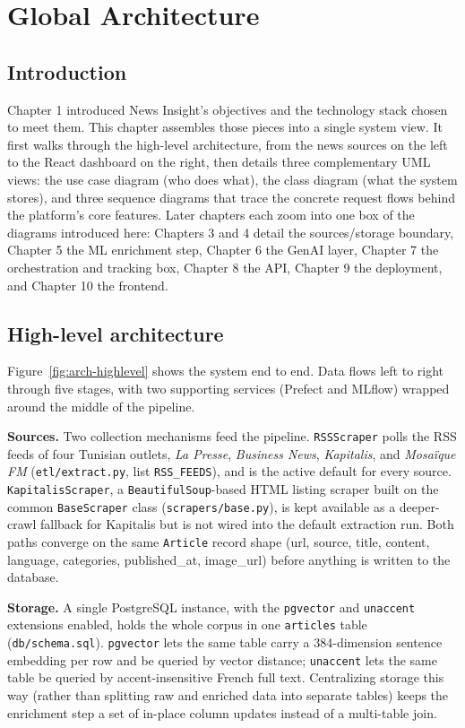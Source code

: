 \chapter{Global Architecture}

\section{Introduction}
Chapter 1 introduced News Insight's objectives and the technology stack chosen to meet them. This chapter assembles those pieces into a single system view. It first walks through the high-level architecture, from the news sources on the left to the React dashboard on the right, then details three complementary UML views: the use case diagram (who does what), the class diagram (what the system stores), and three sequence diagrams that trace the concrete request flows behind the platform's core features. Later chapters each zoom into one box of the diagrams introduced here: Chapters 3 and 4 detail the sources/storage boundary, Chapter 5 the ML enrichment step, Chapter 6 the GenAI layer, Chapter 7 the orchestration and tracking box, Chapter 8 the API, Chapter 9 the deployment, and Chapter 10 the frontend.

\section{High-level architecture}
\label{sec:high-level-arch}
Figure~\ref{fig:arch-highlevel} shows the system end to end. Data flows left to right through five stages, with two supporting services (Prefect and MLflow) wrapped around the middle of the pipeline.

\textbf{Sources.} Two collection mechanisms feed the pipeline. \texttt{RSSScraper} polls the RSS feeds of four Tunisian outlets, \textit{La Presse}, \textit{Business News}, \textit{Kapitalis}, and \textit{Mosaïque FM} (\texttt{etl/extract.py}, list \texttt{RSS\_FEEDS}), and is the active default for every source. \texttt{KapitalisScraper}, a \texttt{BeautifulSoup}-based HTML listing scraper built on the common \texttt{BaseScraper} class (\texttt{scrapers/base.py}), is kept available as a deeper-crawl fallback for Kapitalis but is not wired into the default extraction run. Both paths converge on the same \texttt{Article} record shape (url, source, title, content, language, categories, published\_at, image\_url) before anything is written to the database.

\textbf{Storage.} A single PostgreSQL instance, with the \texttt{pgvector} and \texttt{unaccent} extensions enabled, holds the whole corpus in one \texttt{articles} table (\texttt{db/schema.sql}). \texttt{pgvector} lets the same table carry a 384-dimension sentence embedding per row and be queried by vector distance; \texttt{unaccent} lets the same table be queried by accent-insensitive French full text. Centralizing storage this way (rather than splitting raw and enriched data into separate tables) keeps the enrichment step a set of in-place column updates instead of a multi-table join.

